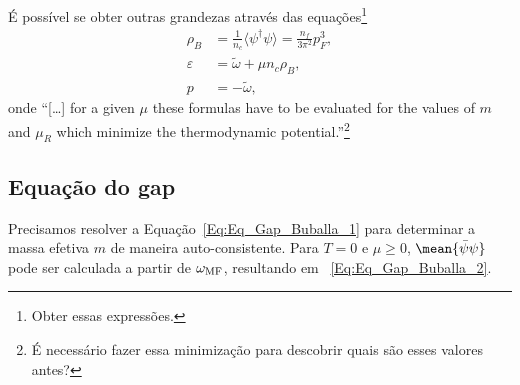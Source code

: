É possível se obter outras grandezas através das equações\footnote{Obter essas expressões.}
\begin{align}
	\rho_B &= \frac{1}{n_c} \langle\psi^\dagger\psi\rangle = \frac{n_f}{3\pi^2}p_F^3, \label{Eq:Rel_Dens_Mom_Fermi_NJL}\\
	\varepsilon &= \tilde{\omega} + \mu n_c \rho_B, \label{Eq:Energia_omega_tilde}\\
	p &= - \tilde{\omega}, \label{Eq:Pressao_omega_tilde}
\end{align}
%
onde ``[\dots] for a given $\mu$ these formulas have to be evaluated for the values of $m$ and $\mu_R$ which minimize the thermodynamic potential.''\footnote{É necessário fazer essa minimização para descobrir quais são esses valores antes?}

\subsection{Equação do gap}

Precisamos resolver a Equação~\eqref{Eq:Eq_Gap_Buballa_1} para determinar a massa efetiva $m$ de maneira auto-consistente. Para $T=0$ e $\mu \geqslant 0$, $\mean{\bar\psi\psi}$ pode ser calculada a partir de $\omega_{\rm{MF}}$, resultando em ~\eqref{Eq:Eq_Gap_Buballa_2}.

